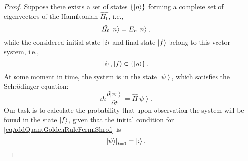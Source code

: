 \begin{proof}
  Suppose there exists a set of states
  $\left\{\ket{n}\right\}$ forming a complete set of eigenvectors
  of the Hamiltonian $\hat{H_0}$, i.e.,
  \begin{equation}
    \hat{H_0} \ket{ n } = E_n \ket{ n },
    \nonumber
  \end{equation}
  while the considered initial state $\ket{i}$ and
  final state $\ket{f}$ belong to this vector system, i.e.,
  \begin{equation}
    \ket{i}, \ket{f} \in \left\{\ket{n}\right\}.
    \nonumber
  \end{equation}
  At some moment in time, the system is in the state
  $\left|\psi\right>$, which satisfies the Schrödinger equation:
  \begin{equation}
    i \hbar \frac{\partial \left|\psi\right>}{\partial t} =
    \hat{H} \left|\psi\right>.
    \label{eqAddQuantGoldenRuleFermiShred}
  \end{equation}
  Our task is to calculate the probability that upon observation
  the system will be found in the state $\ket{f}$, given that
  the initial condition for \eqref{eqAddQuantGoldenRuleFermiShred}
  is
  \begin{equation}
    \left.\left|\psi\right>\right|_{t=0} = \ket{i}.
    \label{eqAddQuantGoldenRuleFermiInitialCond}
  \end{equation}


\end{proof}
